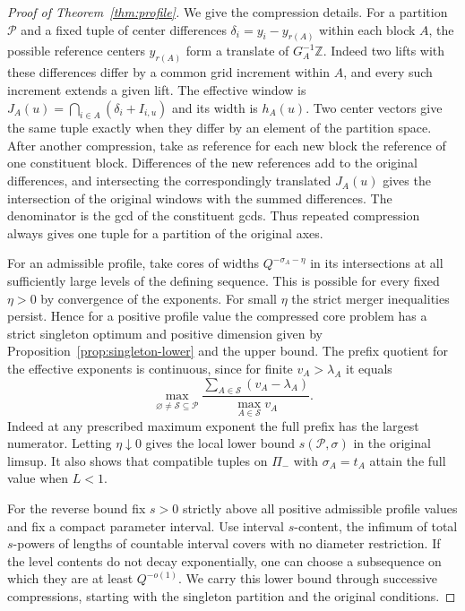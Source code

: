 \documentclass[11pt,reqno,a4paper]{amsart}
\theoremstyle{remark}
\numberwithin{equation}{section}
\begin{document}
\begin{proof}[Proof of Theorem~\ref{thm:profile}]
We give the compression details. For a partition $\mathcal P$
and a fixed tuple of center differences $\delta_i=y_i-y_{r(A)}$
within each block $A$, the possible reference centers
$y_{r(A)}$ form a translate of $G_A^{-1}\mathbb Z$. Indeed two
lifts with these differences differ by a common grid increment
within $A$, and every such increment extends a given lift.
The effective window is $J_A(u)=\bigcap_{i\in A}(\delta_i+I_{i,u})$
and its width is $h_A(u)$. Two center vectors give the same
tuple exactly when they differ by an element of the partition
space. After another compression, take as reference for each
new block the reference of one constituent block. Differences
of the new references add to the original differences, and
intersecting the correspondingly translated $J_A(u)$ gives the
intersection of the original windows with the summed
differences. The denominator is the gcd of the constituent
gcds. Thus repeated compression always gives one tuple for a
partition of the original axes.

For an admissible profile, take cores of widths
$Q^{-\sigma_A-\eta}$ in its intersections at all sufficiently
large levels of the defining sequence. This is possible for
every fixed $\eta>0$ by convergence of the exponents. For small
$\eta$ the strict merger inequalities persist. Hence for a
positive profile value the compressed core problem has a
strict singleton optimum and positive dimension given by
Proposition~\ref{prop:singleton-lower} and the upper bound.
The prefix quotient for the effective exponents is continuous,
since for finite $v_A>\lambda_A$ it equals
\[
 \max_{\varnothing\ne\mathcal S\subseteq\mathcal P}
      \frac{\sum_{A\in\mathcal S}(v_A-\lambda_A)}
           {\max_{A\in\mathcal S}v_A}.
\]
Indeed at any prescribed maximum exponent the full prefix
has the largest numerator. Letting $\eta\downarrow0$ gives
the local lower bound $s(\mathcal P,\sigma)$ in the original
limsup. It also shows that compatible tuples on $\Pi_-$ with
$\sigma_A=t_A$ attain the full value when $L<1$.

For the reverse bound fix $s>0$ strictly above all positive
admissible profile values and fix a compact parameter interval.
Use interval $s$-content, the infimum of total $s$-powers of
lengths of countable interval covers with no diameter
restriction. If the level contents do not decay exponentially,
one can choose a subsequence on which they are at least
$Q^{-o(1)}$. We carry this lower bound through successive
compressions, starting with the singleton partition and the
original conditions.


\end{proof}
\end{document}
